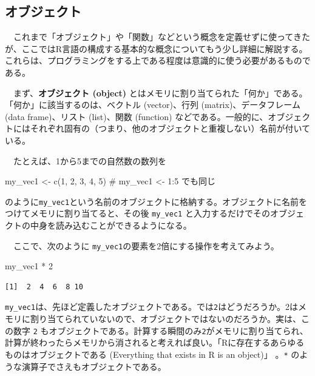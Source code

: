 \documentclass[
  a4paper,
  pandoc,
  ja=standard,
  jafont=haranoaji]{bxjsbook}
\newenvironment{Shaded}{\begin{snugshade}}{\end{snugshade}}
\newcommand{\CommentTok}[1]{\textcolor[rgb]{0.37,0.37,0.37}{#1}}
\newcommand{\DecValTok}[1]{\textcolor[rgb]{0.68,0.00,0.00}{#1}}
\newcommand{\FunctionTok}[1]{\textcolor[rgb]{0.28,0.35,0.67}{#1}}
\newcommand{\NormalTok}[1]{\textcolor[rgb]{0.00,0.48,0.65}{#1}}
\newcommand{\OtherTok}[1]{\textcolor[rgb]{0.00,0.48,0.65}{#1}}
\newcommand{\SpecialCharTok}[1]{\textcolor[rgb]{0.37,0.37,0.37}{#1}}
\begin{document}
\hypertarget{ux30aaux30d6ux30b8ux30a7ux30afux30c8}{%
\subsection{オブジェクト}\label{ux30aaux30d6ux30b8ux30a7ux30afux30c8}}

　これまで「オブジェクト」や「関数」などという概念を定義せずに使ってきたが、ここではR言語の構成する基本的な概念についてもう少し詳細に解説する。これらは、プログラミングをする上である程度は意識的に使う必要があるものである。

　まず、\textbf{オブジェクト (object)}
とはメモリに割り当てられた「何か」である。「何か」に該当するのは、ベクトル
(vector)、行列 (matrix)、データフレーム (data frame)、リスト
(list)、関数 (function)
などである。一般的に、オブジェクトにはそれぞれ固有の（つまり、他のオブジェクトと重複しない）名前が付いている。

　たとえば、1から5までの自然数の数列を

\begin{Shaded}
\begin{Highlighting}[numbers=left,,]
\NormalTok{my\_vec1 }\OtherTok{\textless{}{-}} \FunctionTok{c}\NormalTok{(}\DecValTok{1}\NormalTok{, }\DecValTok{2}\NormalTok{, }\DecValTok{3}\NormalTok{, }\DecValTok{4}\NormalTok{, }\DecValTok{5}\NormalTok{)  }\CommentTok{\# my\_vec1 \textless{}{-} 1:5  でも同じ}
\end{Highlighting}
\end{Shaded}

のように\texttt{my\_vec1}という名前のオブジェクトに格納する。オブジェクトに名前をつけてメモリに割り当てると、その後
\texttt{my\_vec1}
と入力するだけでそのオブジェクトの中身を読み込むことができるようになる。

　ここで、次のように
\texttt{my\_vec1}の要素を2倍にする操作を考えてみよう。

\begin{Shaded}
\begin{Highlighting}[numbers=left,,]
\NormalTok{my\_vec1 }\SpecialCharTok{*} \DecValTok{2}
\end{Highlighting}
\end{Shaded}

\begin{verbatim}
[1]  2  4  6  8 10
\end{verbatim}

\texttt{my\_vec1}は、先ほど定義したオブジェクトである。では\texttt{2}はどうだろうか。2はメモリに割り当てられていないので、オブジェクトではないのだろうか。実は、この数字
\texttt{2}
もオブジェクトである。計算する瞬間のみ\texttt{2}がメモリに割り当てられ、計算が終わったらメモリから消されると考えれば良い。「Rに存在するあらゆるものはオブジェクトである
(Everything that exists in R is an object)」
\citep{Chambers:2016}。\texttt{*}
のような演算子でさえもオブジェクトである。
\end{document}
